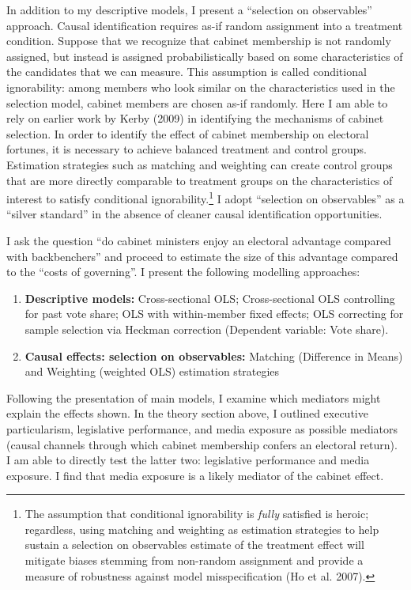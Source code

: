 \documentclass[letter,12pt]{article}
\begin{document}
In addition to my descriptive models, I present a ``selection on observables'' approach. Causal identification requires as-if random assignment into a treatment condition. Suppose that we recognize that cabinet membership is not randomly assigned, but instead is assigned probabilistically based on some characteristics of the candidates that we can measure. This assumption is called conditional ignorability: among members who look similar on the characteristics used in the selection model, cabinet members are chosen as-if randomly. Here I am able to rely on earlier work by Kerby (2009) in identifying the mechanisms of cabinet selection. In order to identify the effect of cabinet membership on electoral fortunes, it is necessary to achieve balanced treatment and control groups. Estimation strategies such as matching and weighting can create control groups that are more directly comparable to treatment groups on the characteristics of interest to satisfy conditional ignorability.\footnote{The assumption that conditional ignorability is \textit{fully} satisfied is heroic; regardless, using matching and weighting as estimation strategies to help sustain a selection on observables estimate of the treatment effect will mitigate biases stemming from non-random assignment and provide a measure of robustness against model misspecification (Ho et al. 2007).} I adopt ``selection on observables'' as a ``silver standard'' in the absence of cleaner causal identification opportunities.

I ask the question ``do cabinet ministers enjoy an electoral advantage compared with backbenchers'' and proceed to estimate the size of this advantage compared to the ``costs of governing''.  I present the following modelling approaches:

\begin{enumerate}
	\item \textbf{Descriptive models:} Cross-sectional OLS; Cross-sectional OLS controlling for past vote share; OLS with within-member fixed effects; OLS correcting for sample selection via Heckman correction (Dependent variable: Vote share).
	\item \textbf{Causal effects: selection on observables:} Matching (Difference in Means) and Weighting (weighted OLS) estimation strategies
\end{enumerate}

Following the presentation of main models, I examine which mediators might explain the effects shown. In the theory section above, I outlined executive particularism, legislative performance, and media exposure as possible mediators (causal channels through which cabinet membership confers an electoral return). I am able to directly test the latter two: legislative performance and media exposure. I find that media exposure is a likely mediator of the cabinet effect.
\end{document}
